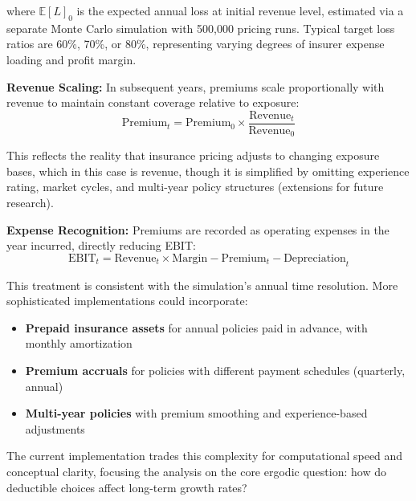 \documentclass[11pt,letterpaper]{article}
\newcommand{\E}{\mathbb{E}}
\begin{document}
where $\E[L]_0$ is the expected annual loss at initial revenue level, estimated via a separate Monte Carlo simulation with 500,000 pricing runs. Typical target loss ratios are 60\%, 70\%, or 80\%, representing varying degrees of insurer expense loading and profit margin.

\vspace{\baselineskip}

\textbf{Revenue Scaling:} In subsequent years, premiums scale proportionally with revenue to maintain constant coverage relative to exposure:
\begin{equation}
\text{Premium}_t = \text{Premium}_0 \times \frac{\text{Revenue}_t}{\text{Revenue}_0}
\end{equation}

This reflects the reality that insurance pricing adjusts to changing exposure bases, which in this case is revenue, though it is simplified by omitting experience rating, market cycles, and multi-year policy structures (extensions for future research).

\vspace{\baselineskip}

\textbf{Expense Recognition:} Premiums are recorded as operating expenses in the year incurred, directly reducing EBIT:
\begin{equation}
\text{EBIT}_t = \text{Revenue}_t \times \text{Margin} - \text{Premium}_t - \text{Depreciation}_t
\end{equation}

This treatment is consistent with the simulation's annual time resolution. More sophisticated implementations could incorporate:
\begin{itemize}
    \item \textbf{Prepaid insurance assets} for annual policies paid in advance, with monthly amortization
    \item \textbf{Premium accruals} for policies with different payment schedules (quarterly, annual)
    \item \textbf{Multi-year policies} with premium smoothing and experience-based adjustments
\end{itemize}

The current implementation trades this complexity for computational speed and conceptual clarity, focusing the analysis on the core ergodic question: how do deductible choices affect long-term growth rates?

\vspace{\baselineskip}
\end{document}
